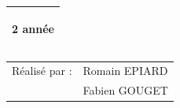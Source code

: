 \begin{titlepage}
\begin{center}
\begin{large}
\begin{bfseries}
\begin{tabular}{|p{10cm}|}
\begin{center}
								2\up{ème} année

							\end{center} \\

							\hline

						\end{tabular}




						\bigskip

						\bigskip

						\bigskip

						\bigskip

						\bigskip

						\bigskip

						\bigskip
						
						\bigskip
						
						\bigskip

						\begin{tabular}{l l}

							Réalisé par : & Romain EPIARD \\
										  & Fabien GOUGET \\

						\end{tabular}
						\bigskip
						\bigskip

					\end{bfseries}

				\end{large}

			\end{center}



		\end{titlepage}